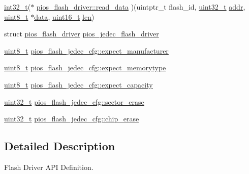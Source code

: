 \begin{DoxyCompactItemize}
\item 
\hyperlink{group___n_a_m_e_gafd12020da5a235dfcf0c3c748fb5baed}{int32\-\_\-t}($\ast$ \hyperlink{group___p_i_o_s___f_l_a_s_h_ga5499ff7cdf896098a6eb43f2f32dc40a}{pios\-\_\-flash\-\_\-driver\-::read\-\_\-data} )(uintptr\-\_\-t flash\-\_\-id, \hyperlink{stdint_8h_a435d1572bf3f880d55459d9805097f62}{uint32\-\_\-t} \hyperlink{group___c_m_s_i_s___core___instruction_interface_gae5c31572d72f992f107a67f7c4e80d5b}{addr}, \hyperlink{stdint_8h_aba7bc1797add20fe3efdf37ced1182c5}{uint8\-\_\-t} $\ast$\hyperlink{pios__opahrs__proto_8h_a20e3f4bfaeccf09a75ef27e095a10112}{data}, \hyperlink{stdint_8h_a273cf69d639a59973b6019625df33e30}{uint16\-\_\-t} \hyperlink{mavlink__helpers_8h_aba59486c1504340293255a065b546e3a}{len})
\item 
struct \hyperlink{structpios__flash__driver}{pios\-\_\-flash\-\_\-driver} \hyperlink{group___p_i_o_s___f_l_a_s_h_gab3923a09f07a535164fd799434276f27}{pios\-\_\-jedec\-\_\-flash\-\_\-driver}
\item 
\hyperlink{stdint_8h_aba7bc1797add20fe3efdf37ced1182c5}{uint8\-\_\-t} \hyperlink{group___p_i_o_s___f_l_a_s_h_gab7416f66a2c392cc5a27e12cbf4e9a07}{pios\-\_\-flash\-\_\-jedec\-\_\-cfg\-::expect\-\_\-manufacturer}
\item 
\hyperlink{stdint_8h_aba7bc1797add20fe3efdf37ced1182c5}{uint8\-\_\-t} \hyperlink{group___p_i_o_s___f_l_a_s_h_gacfb5714f6cef5d14a78a38ebe2369b43}{pios\-\_\-flash\-\_\-jedec\-\_\-cfg\-::expect\-\_\-memorytype}
\item 
\hyperlink{stdint_8h_aba7bc1797add20fe3efdf37ced1182c5}{uint8\-\_\-t} \hyperlink{group___p_i_o_s___f_l_a_s_h_ga33911ac74387cebdbc4bb2fe3d5541a6}{pios\-\_\-flash\-\_\-jedec\-\_\-cfg\-::expect\-\_\-capacity}
\item 
\hyperlink{stdint_8h_a435d1572bf3f880d55459d9805097f62}{uint32\-\_\-t} \hyperlink{group___p_i_o_s___f_l_a_s_h_gae824eeb4a55e49fa84a48f1d43ae788c}{pios\-\_\-flash\-\_\-jedec\-\_\-cfg\-::sector\-\_\-erase}
\item 
\hyperlink{stdint_8h_a435d1572bf3f880d55459d9805097f62}{uint32\-\_\-t} \hyperlink{group___p_i_o_s___f_l_a_s_h_ga24dfbff52821d42480cde7686f07e956}{pios\-\_\-flash\-\_\-jedec\-\_\-cfg\-::chip\-\_\-erase}
\end{DoxyCompactItemize}


\subsection{Detailed Description}
Flash Driver A\-P\-I Definition. 

